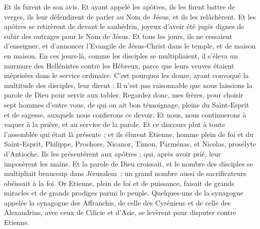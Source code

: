 \begin{multicols}{2}
Et ils furent de son avis. Et ayant appelé les apôtres, ils les firent battre de verges, ils leur défendirent de parler au Nom de Jésus, et ils les relâchèrent.
Et les apôtres se retirèrent de devant le sanhédrin, joyeux d'avoir été jugés dignes de subir des outrages pour le Nom de Jésus.
Et tous les jours, ils ne cessaient d'enseigner, et d'annoncer l’Evangile de Jésus-Christ dans le temple, et de maison en maison.
\VerseOne{}En ces jours-là, comme les disciples se multipliaient, il s'éleva un murmure des Hellénistes contre les Hébreux, parce que leurs veuves étaient méprisées dans le service ordinaire.
C'est pourquoi les douze, ayant convoqué la multitude des disciples, leur dirent : Il n'est pas raisonnable que nous laissions la parole de Dieu pour servir aux tables.
Regardez donc, mes frères, pour choisir sept hommes d’entre vous, de qui on ait bon témoignage, pleins du Saint-Esprit et de sagesse, auxquels nous confierons ce devoir.
Et nous, nous continuerons à vaquer à la prière, et au service de la parole.
Et ce discours plut à toute l'assemblée qui était là présente ; et ils élurent Etienne, homme plein de foi et du Saint-Esprit, Philippe, Prochore, Nicanor, Timon, Parménas, et Nicolas, prosélyte d'Antioche.
Ils les présentèrent aux apôtres ; qui, après avoir prié, leur imposèrent les mains.
Et la parole de Dieu croissait, et le nombre des disciples se multipliait beaucoup dans Jérusalem ; un grand nombre aussi de sacrificateurs obéissait à la foi.
Or Etienne, plein de foi et de puissance, faisait de grands miracles et de grands prodiges parmi le peuple.
Quelques-uns de la synagogue appelée la synagogue des Affranchis, de celle des Cyréniens et de celle des Alexandrins, avec ceux de Cilicie et d'Asie, se levèrent pour disputer contre Etienne.

\end{multicols}
